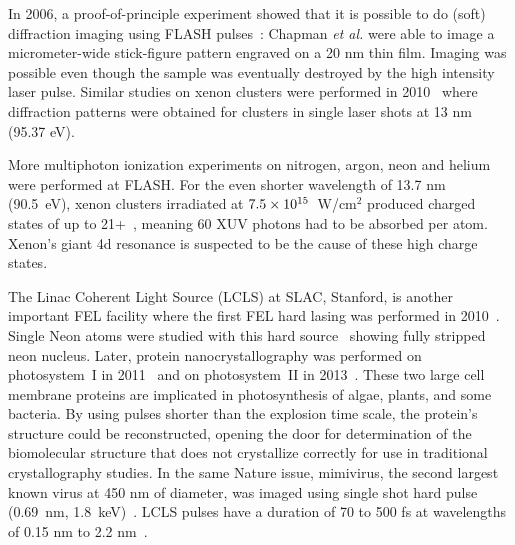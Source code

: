 In 2006, a proof-of-principle experiment showed that it is possible to
do (soft) \xray diffraction imaging using FLASH pulses~\cite{Chapman2006}:
Chapman \textit{et al.} were able to image a micrometer-wide stick-figure pattern
engraved on a 20 nm thin film. Imaging was possible even though the sample was
eventually destroyed by the high intensity \xray laser pulse.
Similar studies on xenon clusters were performed in 2010~\cite{Bostedt2010} where
diffraction patterns were obtained for clusters in single laser shots
at 13 nm (95.37 eV).

More multiphoton
ionization experiments on nitrogen, argon, neon and helium were performed at
FLASH.
For the even shorter wavelength of 13.7 nm (90.5~eV), xenon clusters irradiated at
$\ten{7.5}{15}$~W/cm$^2$ produced charged states of up to 21+~\cite{Sorokin2007,Richter2009},
meaning 60 XUV photons had to be absorbed per atom. Xenon's giant 4d
resonance is suspected to be the cause of these high charge states.

The Linac Coherent Light Source (LCLS) at SLAC, Stanford, is another important
FEL facility where the first FEL hard \xrays lasing was
performed in 2010~\cite{Emma2010,Schneider2010}. Single Neon atoms were studied with
this hard \xray source~\cite{Young2010} showing fully stripped neon nucleus.
Later, protein nanocrystallography was performed
on photosystem~I in 2011~\cite{Chapman2011} and on photosystem~II in
2013~\cite{Kern2013}. These two large cell membrane proteins are implicated in
photosynthesis of algae, plants, and some bacteria.
By using pulses shorter
than the explosion time scale, the protein's structure could be reconstructed,
opening the door for determination of the biomolecular structure that
does not crystallize correctly for use in traditional crystallography studies.
In the same Nature issue, mimivirus, the second largest known virus at 450 nm
of diameter, was imaged using single shot hard \xray pulse (0.69~nm,
1.8~keV)~\cite{Seibert2011}. LCLS pulses have a duration of 70 to 500 fs at
wavelengths of 0.15 nm to 2.2 nm~\cite{Pellegrini2011}.

